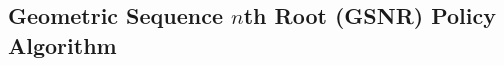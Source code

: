 \subsection{Geometric Sequence $n$th Root (GSNR) Policy Algorithm}
\label{sec:geom-seq-nth-root-algo}







